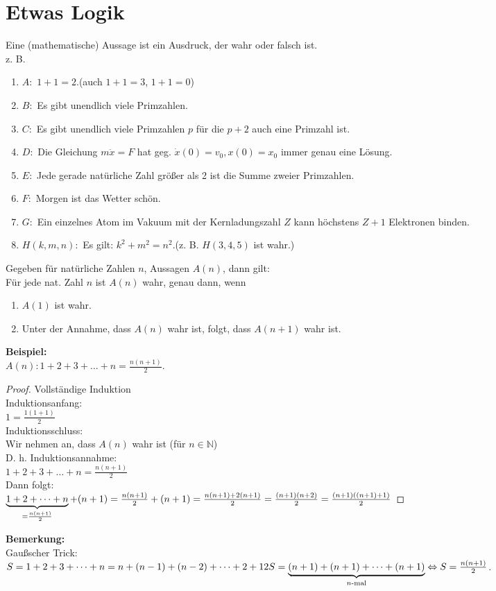 \documentclass[12pt,a4paper,titlepage]{article} %
\newcommand{\bsp}{\textbf{Beispiel:}\\}
\newcommand{\bemerkung}{\textbf{Bemerkung:\\}}
\begin{document}
\section{Etwas Logik}
Eine (mathematische) Aussage ist ein Ausdruck, der wahr oder falsch ist.\\
z. B.
\begin{enumerate}
  \item $A :$ \glqq $1+1=2$.\grqq (auch \glqq $1+1=3$\grqq, \glqq $1+1=0$\grqq)
  \item $B :$ \glqq Es gibt unendlich viele Primzahlen.\grqq
  \item $C :$ \glqq Es gibt unendlich viele Primzahlen $p$ für die $p + 2$ auch eine Primzahl ist.\grqq
  \item $D :$ \glqq Die Gleichung $m \ddot{x} = F$ hat geg. $\dot{x}(0) = v_0, x(0) = x_0$ immer genau eine Lösung.\grqq
  \item $E :$ \glqq Jede gerade natürliche Zahl größer als 2 ist die Summe zweier Primzahlen.\grqq
  \item $F :$ \glqq Morgen ist das Wetter schön.\grqq
  \item $G :$ \glqq Ein einzelnes Atom im Vakuum mit der Kernladungszahl $Z$ kann höchstens $Z+1$ Elektronen binden.\grqq
  \item $H(k,m,n) :$ \glqq Es gilt: $k^2 + m^2 = n^2$.\grqq (z. B. $H(3,4,5)$ ist wahr.)    
\end{enumerate}
Gegeben für natürliche Zahlen $n$, Aussagen $A(n)$, dann gilt:\\
Für jede nat. Zahl $n$ ist $A(n)$ wahr, genau dann, wenn 
\begin{enumerate}
  \item $A(1)$ ist wahr.
  \item Unter der Annahme, dass $A(n)$ wahr ist, folgt, dass $A(n+1)$ wahr ist.
\end{enumerate}
\bsp 
$A(n): 1+2+3+\dots+n=\frac{n(n+1)}{2}$.
\begin{proof} Vollständige Induktion\\
  Induktionsanfang:\\
  $1 = \frac{1(1+1)}{2}$ \checkmark\\
  Induktionsschluss:\\
  Wir nehmen an, dass $A(n)$ wahr ist (für $n\in\mathbb{N}$)\\
  D. h. Induktionsannahme:\\
  $1+2+3+\dots+n=\frac{n(n+1)}{2}$\\
  Dann folgt:\\
  $\underbrace{1+2+\dots+n}_{=\frac{n(n+1)}{2}}+(n+1)=\frac{n(n+1)}{2}+(n+1) \\
  =\frac{n(n+1) + 2(n+1)}{2} = \frac{(n+1)(n+2)}{2} = \frac{(n+1)((n+1)+1)}{2}$
\end{proof}
\bemerkung
Gaußscher Trick:\\
$S=1+2+3+\dots+n=n+(n-1)+(n-2)+\dots+2+1\\
2S = \underbrace{(n+1)+(n+1)+\dots+(n+1)}_{n\text{-mal}} \Leftrightarrow S = \frac{n(n+1)}{2}$.
\end{document}
